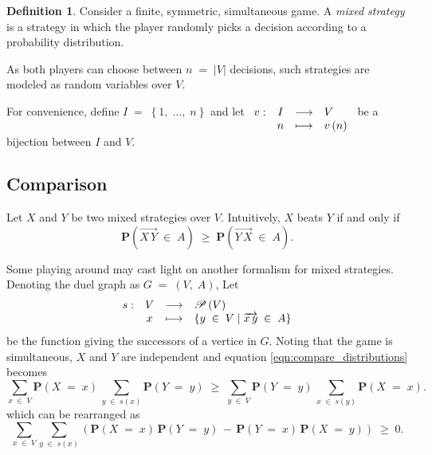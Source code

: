 \documentclass{report}
\theoremstyle{definition}
\newtheorem{defn}{Definition}
\theoremstyle{plain}
\begin{document}
\begin{defn}
	Consider a finite, symmetric, simultaneous game. A \emph{mixed
	strategy} is a strategy in which the player randomly picks a decision
	according to a probability distribution.

	As both players can choose between $n\;=\;\left|V\right|$ decisions,
	such strategies are modeled as random variables over $V$.
\end{defn}

For convenience, define $I\;=\;\left\{1,\;\ldots,\;n\right\}$ and let
$\begin{array}[t]{cccl}v:&I&\longrightarrow&V \\
&n&\longmapsto&v\left(n\right)\end{array}$ be a bijection between $I$ and $V$.

\subsection{Comparison}
Let $X$ and $Y$ be two mixed strategies over $V$. Intuitively, $X$ beats $Y$ if
and only if
\begin{equation}
	\mathbf P\left(\overrightarrow{X\,Y}\;\in\;A\right)\;
	\geqslant\;\mathbf P\left(\overrightarrow{Y\,X}\;\in\;A\right).
	\label{eqn:compare_distributions}
\end{equation}

Some playing around may cast light on another formalism for mixed strategies.
Denoting the duel graph as $G\;=\;\left(V,\;A\right)$, Let \[
\begin{array}[t]{cccl}
s:&V&\longrightarrow&\mathscr P\left(V\right) \\
&x&\longmapsto&\left\{y\;\in\;V\mid\overrightarrow{x\,y}\;\in\;A\right\}
\end{array}
\] be the function giving the successors of a vertice in $G$. Noting that the
game is simultaneous, $X$ and $Y$ are independent and equation
\ref{eqn:compare_distributions} becomes \[
	\sum_{x\;\in\;V}\mathbf P\left(X\;=\;x\right)\,
	\sum_{y\;\in\;s\left(x\right)}\mathbf P\left(Y\;=\;y\right)
	\;\geqslant\;
	\sum_{y\;\in\;V}\mathbf P\left(Y\;=\;y\right)\,
	\sum_{x\;\in\;s\left(y\right)}\mathbf P\left(X\;=\;x\right).
\] which can be rearranged as
\begin{equation}
	\sum_{x\;\in\;V}\sum_{y\;\in\;s\left(x\right)}\left(
	\mathbf P\left(X\;=\;x\right)\,\mathbf P\left(Y\;=\;y\right)
	\,-\,
	\mathbf P\left(Y\;=\;x\right)\,\mathbf P\left(X\;=\;y\right)\right)
	\;\geqslant\;0.
	\label{eqn:rearranged_comparison}
\end{equation}
\end{document}
